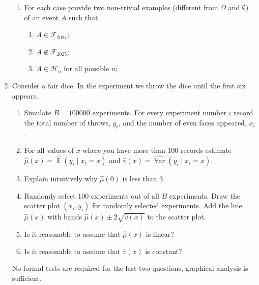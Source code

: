 \documentclass[12pt]{article}
\DeclareMathOperator{\Var}{\mathbb{V}ar}
\DeclareMathOperator{\E}{\mathbb{E}}
\newcommand{\cF}{\mathcal{F}}
\newcommand{\cH}{\mathcal{H}}
\begin{document}
\begin{enumerate}
\begin{enumerate}
\item For each case provide two non-trivial examples (different from $\Omega$ and $\emptyset$) of an event $A$ such that

\begin{enumerate}
\item $A\in \cF_{2024}$;
\item $A\notin \cF_{2025}$;
\item $A \in \cH_{n}$ for all possible $n$;
\end{enumerate}


\end{enumerate}

\item Consider a fair dice. 
In the experiment we throw the dice until the first six appears.

\begin{enumerate}
    \item Simulate $B = 100000$ experiments. 
    For every experiment number $i$ record the total number of throws, $y_i$, and the number of even faces appeared, $x_i$.
    \item For all values of $x$ where you have more than $100$ records estimate $\hat\mu(x) = \hat{\E}(y_i \mid x_i = x)$ and $\hat v(x) = \widehat{\Var}(y_i \mid x_i = x)$.
    \item Explain intuitively why $\hat\mu(0)$ is less than $3$. 
    \item Randomly select $100$ experiments out of all $B$ experiments.
    Draw the scatter plot $(x_i, y_i)$ for randomly selected experiments.
    Add the line $\hat\mu(x)$ with bands $\hat\mu(x) \pm 2\sqrt{\hat v(x)}$ to the scatter plot. 
    \item Is it reasonable to assume that $\hat \mu(x)$ is linear?
    \item Is it reasonable to assume that $\hat v(x)$ is constant?
\end{enumerate}

No formal tests are required for the last two questions, graphical analysis is sufficient.


\end{enumerate}
\end{document}
